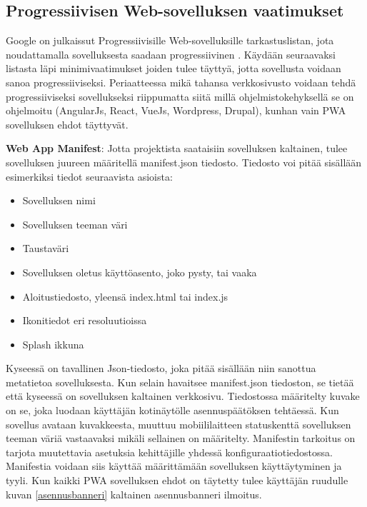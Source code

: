 \documentclass{tktltiki}
\begin{document}
\subsection{Progressiivisen Web-sovelluksen vaatimukset}

Google on julkaissut Progressiivisille Web-sovelluksille tarkastuslistan, jota noudattamalla sovelluksesta saadaan progressiivinen \cite{Google}. Käydään seuraavaksi listasta läpi minimivaatimukset joiden tulee täyttyä, jotta sovellusta voidaan sanoa progressiiviseksi. Periaatteessa mikä tahansa verkkosivusto voidaan tehdä progressiiviseksi sovellukseksi \cite{hiltunen2018creating} riippumatta siitä millä ohjelmistokehyksellä se on ohjelmoitu (AngularJs, React, VueJs, Wordpress, Drupal), kunhan vain PWA sovelluksen ehdot täyttyvät.

\textbf{Web App Manifest}: Jotta projektista saataisiin sovelluksen kaltainen, tulee sovelluksen juureen määritellä manifest.json tiedosto. Tiedosto voi pitää sisällään esimerkiksi tiedot seuraavista asioista:

\begin{itemize}
  \item Sovelluksen nimi
  \item Sovelluksen teeman väri
  \item Taustaväri
  \item Sovelluksen oletus käyttöasento, joko pysty, tai vaaka
  \item Aloitustiedosto, yleensä index.html tai index.js
  \item Ikonitiedot eri resoluutioissa
  \item Splash ikkuna
\end{itemize}

Kyseessä on tavallinen Json-tiedosto, joka pitää sisällään niin sanottua metatietoa sovelluksesta. Kun selain havaitsee manifest.json tiedoston, se tietää että kyseessä on sovelluksen kaltainen verkkosivu. Tiedostossa määritelty kuvake on se, joka luodaan käyttäjän kotinäytölle asennuspäätöksen tehtäessä. Kun sovellus avataan kuvakkeesta, muuttuu mobiililaitteen statuskenttä sovelluksen teeman väriä vastaavaksi mikäli sellainen on määritelty. Manifestin tarkoitus on tarjota muutettavia asetuksia kehittäjille yhdessä konfiguraatiotiedostossa. \cite{biorn2017progressive} Manifestia voidaan siis käyttää määrittämään sovelluksen käyttäytyminen ja tyyli. Kun kaikki PWA sovelluksen ehdot on täytetty tulee käyttäjän ruudulle kuvan \ref{asennusbanneri} kaltainen asennusbanneri ilmoitus.
\end{document}
